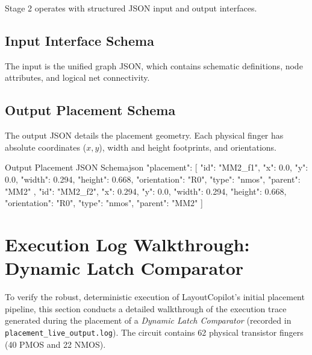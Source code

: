Stage 2 operates with structured JSON input and output interfaces.

\subsection{Input Interface Schema}
The input is the unified graph JSON, which contains schematic definitions, node attributes, and logical net connectivity.

\subsection{Output Placement Schema}
The output JSON details the placement geometry. Each physical finger has absolute coordinates ($x, y$), width and height footprints, and orientations.

\begin{thesiscode}{Output Placement JSON Schema}{json}
{
  "placement": [
    {
      "id": "MM2_f1",
      "x": 0.0,
      "y": 0.0,
      "width": 0.294,
      "height": 0.668,
      "orientation": "R0",
      "type": "nmos",
      "parent": "MM2"
    },
    {
      "id": "MM2_f2",
      "x": 0.294,
      "y": 0.0,
      "width": 0.294,
      "height": 0.668,
      "orientation": "R0",
      "type": "nmos",
      "parent": "MM2"
    }
  ]
}
\end{thesiscode}

\section[Log File Trace Walkthrough]{Execution Log Walkthrough: Dynamic Latch Comparator}
\label{sec:log_walkthrough}

To verify the robust, deterministic execution of LayoutCopilot's initial placement pipeline, this section conducts a detailed walkthrough of the execution trace generated during the placement of a \emph{Dynamic Latch Comparator} (recorded in \texttt{placement\_live\_output.log}). The circuit contains 62 physical transistor fingers (40 PMOS and 22 NMOS).

